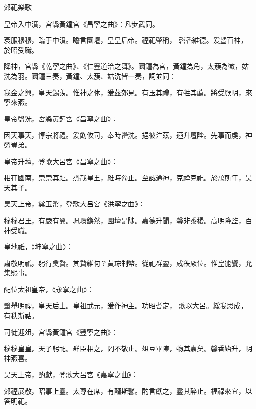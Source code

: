 \begin{pinyinscope}
 郊祀樂歌



 皇帝入中濆，宮縣黃鐘宮《昌寧之曲》：凡步武同。



 袞服穆穆，臨于中濆。瞻言圜壇，皇皇后帝。禋祀肇稱，
 磬香維德。爰暨百神，於昭受職。



 降神，宮縣《乾寧之曲》、《仁豐道洽之舞》。圜鐘為宮，黃鐘為角，太蔟為徵，姑洗為羽。圜鐘三奏，黃鐘、太蔟、姑洗皆一奏，詞並同：



 我金之興，皇天錫羨。惟神之休，爰茲郊見。有玉其禮，有牲其薦。將受厥明，來寧來燕。



 皇帝盥洗，宮縣黃鐘宮《昌寧之曲》：



 因天事天，惇宗將禮。爰飭攸司，奉時罍洗。挹彼注茲，迺升壇陛。先事而虔，神勞豈弟。



 皇帝升壇，登歌大呂宮《昌寧之曲》：



 相在國南，崇崇其趾。烝哉皇王，維時蒞止。至誠通神，克禋克祀。於萬斯年，昊天其子。



 昊天上帝，奠玉幣，登歌大呂宮《洪寧之曲》：



 穆穆君王，有嚴有翼。珮環鏘然，圜壇是陟。嘉德升聞，馨非黍稷。高明降監，百神受職。



 皇地祇，《坤寧之曲》：



 肅敬明祇，躬行奠贄。其贄維何？黃琮制幣。從祀群靈，咸秩厥位。惟皇能饗，允集熙事。



 配位太祖皇帝，《永寧之曲》：



 肇舉明禋，皇天后土。皇祖武元，爰作神主。功昭耆定，
 歌以大呂。綏我思成，有秩斯祜。



 司徒迎俎，宮縣黃鐘宮《豐寧之曲》：



 穆穆皇皇，天子躬祀。群臣相之，罔不敬止。俎豆畢陳，物其嘉矣。馨香始升，明神燕喜。



 昊天上帝，酌獻，登歌大呂宮《嘉寧之曲》：



 郊禋展敬，昭事上靈。太尊在席，有醑斯馨。酌言獻之，靈其醉止。福祿來宜，以答明祀。




\end{pinyinscope}

